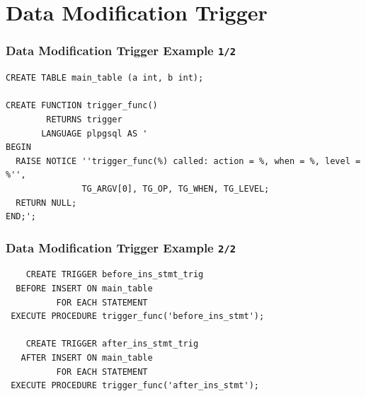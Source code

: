 \documentclass{beamer}
\begin{document}
\section{Data Modification Trigger}


\begin{frame}[fragile]
  \frametitle{Data Modification Trigger Example \texttt{1/2}}

\begin{verbatim}
CREATE TABLE main_table (a int, b int);

CREATE FUNCTION trigger_func()
        RETURNS trigger
       LANGUAGE plpgsql AS '
BEGIN
  RAISE NOTICE ''trigger_func(%) called: action = %, when = %, level = %'',
               TG_ARGV[0], TG_OP, TG_WHEN, TG_LEVEL;
  RETURN NULL;
END;';
\end{verbatim}
\end{frame}

\begin{frame}[fragile]
  \frametitle{Data Modification Trigger Example \texttt{2/2}}

\begin{verbatim}
    CREATE TRIGGER before_ins_stmt_trig
  BEFORE INSERT ON main_table
          FOR EACH STATEMENT
 EXECUTE PROCEDURE trigger_func('before_ins_stmt');

    CREATE TRIGGER after_ins_stmt_trig
   AFTER INSERT ON main_table
          FOR EACH STATEMENT
 EXECUTE PROCEDURE trigger_func('after_ins_stmt');
\end{verbatim}
\end{frame}
\end{document}
